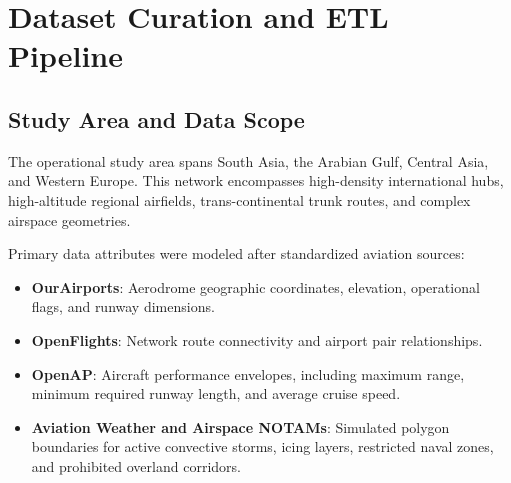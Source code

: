 \documentclass[conference]{IEEEtran}
\begin{document}
\section{Dataset Curation and ETL Pipeline}

\subsection{Study Area and Data Scope}
The operational study area spans South Asia, the Arabian Gulf, Central Asia, and Western Europe. This network encompasses high-density international hubs, high-altitude regional airfields, trans-continental trunk routes, and complex airspace geometries. 

Primary data attributes were modeled after standardized aviation sources:
\begin{itemize}
    \item \textbf{OurAirports}: Aerodrome geographic coordinates, elevation, operational flags, and runway dimensions.
    \item \textbf{OpenFlights}: Network route connectivity and airport pair relationships.
    \item \textbf{OpenAP}: Aircraft performance envelopes, including maximum range, minimum required runway length, and average cruise speed.
    \item \textbf{Aviation Weather and Airspace NOTAMs}: Simulated polygon boundaries for active convective storms, icing layers, restricted naval zones, and prohibited overland corridors.
\end{itemize}
\end{document}
